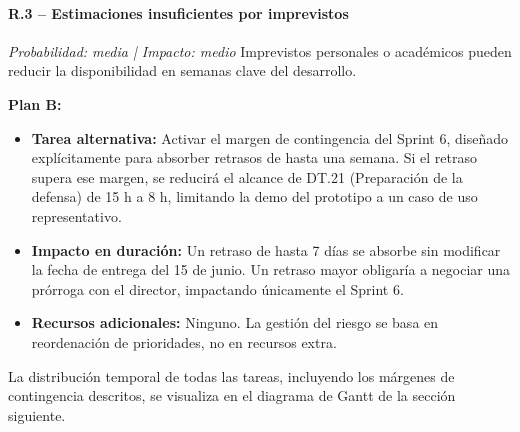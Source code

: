 \documentclass{article}
\begin{document}
{        \paragraph{R.3 – Estimaciones insuficientes por imprevistos}
        \textit{Probabilidad: media | Impacto: medio}
        \justify
        Imprevistos personales o académicos pueden reducir la disponibilidad en semanas 
        clave del desarrollo.

        \textbf{Plan B:}
        \begin{itemize}[leftmargin=*, itemsep=1pt]
            \item \textbf{Tarea alternativa:} Activar el margen de contingencia del Sprint 6, 
            diseñado explícitamente para absorber retrasos de hasta una semana. Si el retraso 
            supera ese margen, se reducirá el alcance de DT.21 (Preparación de la defensa) 
            de 15 h a 8 h, limitando la demo del prototipo a un caso de uso representativo.
            \item \textbf{Impacto en duración:} Un retraso de hasta 7 días se absorbe sin 
            modificar la fecha de entrega del 15 de junio. Un retraso mayor obligaría a 
            negociar una prórroga con el director, impactando únicamente el Sprint 6.
            \item \textbf{Recursos adicionales:} Ninguno. La gestión del riesgo se basa en 
            reordenación de prioridades, no en recursos extra.
        \end{itemize}
            
        
        \justify
        La distribución temporal de todas las tareas, incluyendo los márgenes de 
        contingencia descritos, se visualiza en el diagrama de Gantt de la sección 
        siguiente.

        \newpage
        \begin{landscape}  %
            \thispagestyle{empty} %
            

\end{landscape}}
\end{document}

